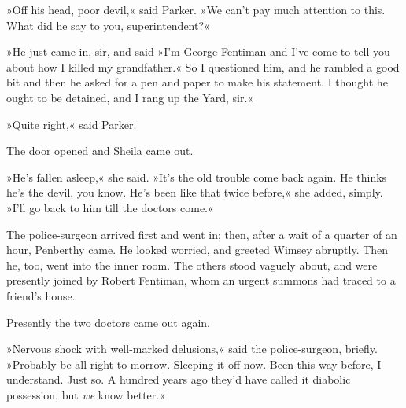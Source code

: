 
»Off his head, poor devil,« said Parker. »We can't pay much attention to this. What did he say to you, superintendent?«

»He just came in, sir, and said »I'm George Fentiman and I've come to tell you about how I killed my grandfather.« So I questioned him, and he rambled a good bit and then he asked for a pen and paper to make his statement. I thought he ought to be detained, and I rang up the Yard, sir.«

»Quite right,« said Parker.

The door opened and Sheila came out.

»He's fallen asleep,« she said. »It's the old trouble come back again. He thinks he's the devil, you know. He's been like that twice before,« she added, simply. »I'll go back to him till the doctors come.«

The police-surgeon arrived first and went in; then, after a wait of a quarter of an hour, Penberthy came. He looked worried, and greeted Wimsey abruptly. Then he, too, went into the inner room. The others stood vaguely about, and were presently joined by Robert Fentiman, whom an urgent summons had traced to a friend's house.

Presently the two doctors came out again.

»Nervous shock with well-marked delusions,« said the police-surgeon, briefly. »Probably be all right to-morrow. Sleeping it off now. Been this way before, I understand. Just so. A hundred years ago they'd have called it diabolic possession, but \textit{we} know better.«

